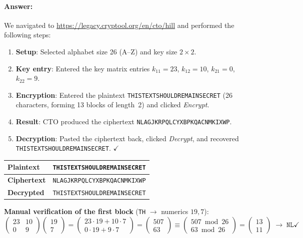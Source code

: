 \documentclass[]{scrartcl}
\begin{document}
\paragraph{Answer:}

We navigated to \url{https://legacy.cryptool.org/en/cto/hill} and performed the following steps:

\begin{enumerate}
    \item \textbf{Setup}: Selected alphabet size 26 (A--Z) and key size $2\times2$.
    \item \textbf{Key entry}: Entered the key matrix entries $k_{11}=23$, $k_{12}=10$, $k_{21}=0$, $k_{22}=9$.
    \item \textbf{Encryption}: Entered the plaintext \texttt{THISTEXTSHOULDREMAINSECRET} (26 characters, forming 13 blocks of length~2) and clicked \emph{Encrypt}.
    \item \textbf{Result}: CTO produced the ciphertext \texttt{NLAGJKRPQLCYXBPKQACNMKIXWP}.
    \item \textbf{Decryption}: Pasted the ciphertext back, clicked \emph{Decrypt}, and recovered \texttt{THISTEXTSHOULDREMAINSECRET}. $\checkmark$
\end{enumerate}

\medskip
\begin{center}
\begin{tabular}{|l|l|}
\hline
\textbf{Plaintext}  & \texttt{THISTEXTSHOULDREMAINSECRET} \\
\hline
\textbf{Ciphertext} & \texttt{NLAGJKRPQLCYXBPKQACNMKIXWP} \\
\hline
\textbf{Decrypted}  & \texttt{THISTEXTSHOULDREMAINSECRET} \\
\hline
\end{tabular}
\end{center}

\textbf{Manual verification of the first block} (\texttt{TH} $\to$ numerics $19,7$):
\[
\begin{pmatrix}23 & 10\\0 & 9\end{pmatrix}\begin{pmatrix}19\\7\end{pmatrix}
=\begin{pmatrix}23\cdot19+10\cdot7\\0\cdot19+9\cdot7\end{pmatrix}
=\begin{pmatrix}507\\63\end{pmatrix}
\equiv\begin{pmatrix}507\bmod26\\63\bmod26\end{pmatrix}
=\begin{pmatrix}13\\11\end{pmatrix}
\;\longrightarrow\;\texttt{NL}\checkmark
\]
\end{document}
